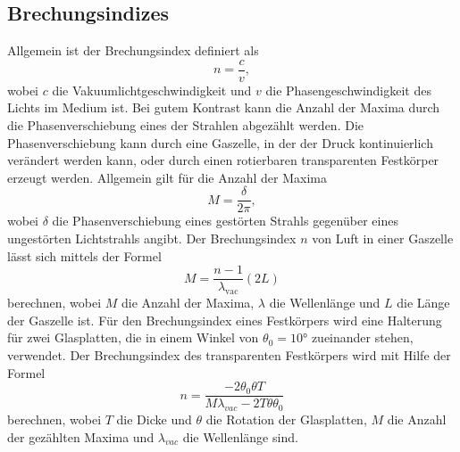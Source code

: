 \subsection{Brechungsindizes}
Allgemein ist der Brechungsindex definiert als
\begin{equation*}
  n = \frac{c}{v},
\end{equation*}
wobei $c$ die Vakuumlichtgeschwindigkeit und $v$ die Phasengeschwindigkeit des Lichts im Medium ist.
Bei gutem Kontrast kann die Anzahl der Maxima durch die Phasenverschiebung eines
der Strahlen abgezählt werden. Die Phasenverschiebung kann durch eine Gaszelle,
in der der Druck kontinuierlich verändert werden kann, oder durch einen rotierbaren
transparenten Festkörper erzeugt werden.
Allgemein gilt für die Anzahl der Maxima
\begin{equation*}
  M = \frac{\delta}{2\pi},
\end{equation*}
wobei $\delta$ die Phasenverschiebung eines gestörten Strahls gegenüber eines
ungestörten Lichtstrahls angibt.
Der Brechungsindex $n$ von Luft in einer Gaszelle lässt sich mittels der Formel
\begin{equation}
  M = \frac{n-1}{\lambda_{\text{vac}}}(2L)
  \label{eqn:brechluft}
\end{equation}
berechnen,
wobei $M$ die Anzahl der Maxima, $\lambda$ die Wellenlänge und $L$ die Länge der Gaszelle ist.
Für den Brechungsindex eines Festkörpers wird eine Halterung für zwei Glasplatten,
die in einem Winkel von $\theta_0 = 10°$ zueinander stehen, verwendet.
Der Brechungsindex des transparenten Festkörpers wird mit Hilfe der Formel
\begin{equation}
  n = \frac{-2 \theta_0\theta T}{M\lambda_{vac} - 2 T\theta\theta_0}
\end{equation}
berechnen, wobei $T$ die Dicke und $\theta$ die Rotation der Glasplatten, $M$ die
Anzahl der gezählten Maxima und $\lambda_{vac}$ die Wellenlänge sind.
